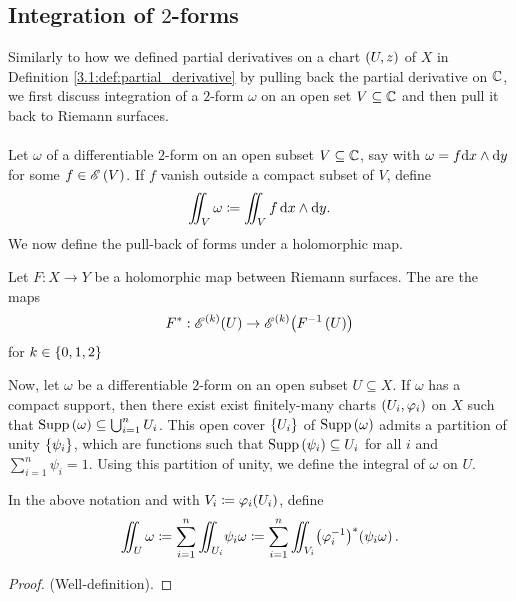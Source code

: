 \documentclass[../Moduli_Spaces_of_Riemann_Surfaces.tex]{subfiles}
\begin{document}
    \subsection{Integration of $2$-forms}
    Similarly to how we defined partial derivatives on a chart $\left(U,z\right)$ of $X$ in Definition \ref{3.1:def:partial_derivative} by pulling back the partial derivative on $\mathbb{C}$, we first discuss integration of a $2$-form $\omega$ on an open set $V\subseteq\mathbb{C}$ and then pull it back to Riemann surfaces.\\\ \\
    Let $\omega$ of a differentiable $2$-form on an open subset $V\subseteq\mathbb{C}$, say with $\omega=f\mathrm{d} x\wedge\mathrm{d} y$ for some $f\in\mathscr{E}\left(V\right)$. If $f$ vanish outside a compact subset of $V$, define
    \begin{equation*}
        \iint_V\omega\coloneqq\iint_Vf\,\mathrm{d} x\wedge\mathrm{d} y.
    \end{equation*}
    We now define the pull-back of forms under a holomorphic map.
    \begin{definition}
        Let $F:X\to Y$ be a holomorphic map between Riemann surfaces. The  are the maps
        \begin{equation*}
            F^\ast:\mathscr{E}^{\left(k\right)}\!\left(U\right)\to\mathscr{E}^{\left(k\right)}\!\left(F^{-1}\left(U\right)\right)
        \end{equation*}
        for $k\in\left\{0,1,2\right\}$
    \end{definition}
    Now, let $\omega$ be a differentiable $2$-form on an open subset $U\subseteq X$. If $\omega$ has a compact support, then there exist exist finitely-many charts $\left(U_i,\varphi_i\right)$ on $X$ such that $\operatorname{Supp}\left(\omega\right)\subseteq\bigcup_{i=1}^{n}U_i$. This open cover $\left\{U_i\right\}$ of $\operatorname{Supp}\left(\omega\right)$ admits a partition of unity $\left\{\psi_i\right\}$, which are functions such that $\operatorname{Supp}\left(\psi_i\right)\subseteq U_i$ for all $i$ and $\sum_{i=1}^n\psi_i=1$. Using this partition of unity, we define the integral of $\omega$ on $U$.
    \begin{defprop}
        In the above notation and with $V_i\coloneqq\varphi_i\!\left(U_i\right)$, define
        \begin{equation*}
            \iint_U\omega\coloneqq\sum_{i=1}^{n}\iint_{U_i}\!\psi_i\omega\coloneqq\sum_{i=1}^{n}\iint_{V_i}\!\big(\varphi_i^{-1}\big)^\ast\!\left(\psi_i\omega\right).
        \end{equation*}
    \end{defprop}
    \begin{proof}
        (Well-definition). 
    \end{proof}
\end{document}
